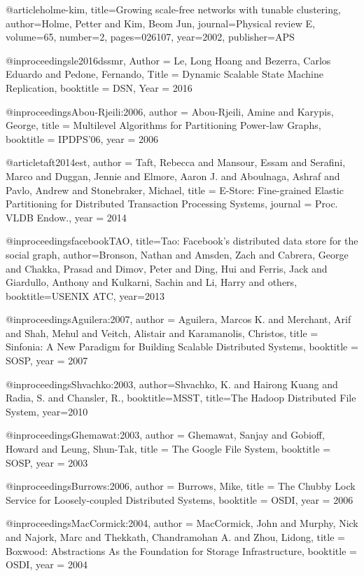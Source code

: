 @article{holme-kim,
 title={Growing scale-free networks with tunable clustering},
 author={Holme, Petter and Kim, Beom Jun},
 journal={Physical review E},
 volume={65},
 number={2},
 pages={026107},
 year={2002},
 publisher={APS}
}

@inproceedings{le2016dssmr,
Author    = {Le, Long Hoang and Bezerra, Carlos Eduardo and Pedone, Fernando},
Title     = {Dynamic Scalable State Machine Replication},
booktitle   = {DSN},
Year      = {2016}
}

@inproceedings{Abou-Rjeili:2006,
 author = {Abou-Rjeili, Amine and Karypis, George},
 title = {Multilevel Algorithms for Partitioning Power-law Graphs},
 booktitle = {IPDPS'06},
 year = {2006}
}

@article{taft2014est,
 author = {Taft, Rebecca and Mansour, Essam and Serafini, Marco and Duggan, Jennie and Elmore, Aaron J. and Aboulnaga, Ashraf and Pavlo, Andrew and Stonebraker, Michael},
 title = {{E-Store}: Fine-grained Elastic Partitioning for Distributed Transaction Processing Systems},
 journal = {Proc. VLDB Endow.},
 year = {2014}
}

@inproceedings{facebookTAO,
  title={Tao: Facebook's distributed data store for the social graph},
  author={Bronson, Nathan and Amsden, Zach and Cabrera, George and Chakka, Prasad and Dimov, Peter and Ding, Hui and Ferris, Jack and Giardullo, Anthony and Kulkarni, Sachin and Li, Harry and others},
  booktitle={USENIX ATC},
  year={2013}
}

@inproceedings{Aguilera:2007,
 author = {Aguilera, Marcos K. and Merchant, Arif and Shah, Mehul and Veitch, Alistair and Karamanolis, Christos},
 title = {Sinfonia: A New Paradigm for Building Scalable Distributed Systems},
 booktitle = {SOSP},
 year = {2007}
 }

@inproceedings{Shvachko:2003,
author={Shvachko, K. and Hairong Kuang and Radia, S. and Chansler, R.},
booktitle={MSST},
title={The Hadoop Distributed File System},
year={2010}
}

@inproceedings{Ghemawat:2003,
 author = {Ghemawat, Sanjay and Gobioff, Howard and Leung, Shun-Tak},
 title = {The Google File System},
 booktitle = {SOSP},
 year = {2003}
}

@inproceedings{Burrows:2006,
 author = {Burrows, Mike},
 title = {The Chubby Lock Service for Loosely-coupled Distributed Systems},
 booktitle = {OSDI},
 year = {2006}
 }

@inproceedings{MacCormick:2004,
 author = {MacCormick, John and Murphy, Nick and Najork, Marc and Thekkath, Chandramohan A. and Zhou, Lidong},
 title = {Boxwood: Abstractions As the Foundation for Storage Infrastructure},
 booktitle = {OSDI},
 year = {2004}
 }


